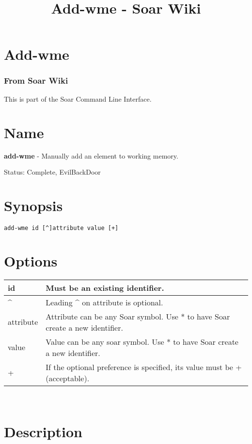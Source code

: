 \documentclass[10pt]{article}
\title{Add-wme - Soar Wiki}
\begin{document}
\section*{Add-wme}
\subsubsection*{From Soar Wiki}


 This is part of the Soar Command Line Interface. 
\section*{ Name }


 \textbf{add-wme}
 - Manually add an element to working memory. 


 Status: Complete, EvilBackDoor
\section*{ Synopsis }


  \begin{verbatim}
add-wme id [^]attribute value [+]

\end{verbatim}



 
\section*{ Options }


\begin{tabular}{|p{1in}|p{5in}|}
\hline 
 id  & Must be an existing identifier.  \\
 \hline 
 \^{}  & Leading \^{} on attribute is optional.  \\
 \hline 
 attribute  & Attribute can be any Soar symbol. Use * to have Soar create a new identifier.  \\
 \hline 
 value  & Value can be any soar symbol. Use * to have Soar create a new identifier.  \\
 \hline 
 +  & If the optional preference is specified, its value must be + (acceptable).  \\
 \hline 

\end{tabular}



 \\ 

\section*{ Description }
\end{document}
